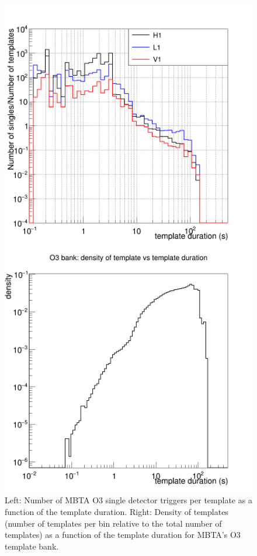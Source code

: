 \begin{figure}[hb]
  \centering
  \begin{minipage}{0.45\linewidth}
    \includegraphics[width=\textwidth]{sectionSelection/plotsOther/cDurationSingles.png}
  \end{minipage}
  \hfill
  \begin{minipage}{0.45\linewidth}
    \includegraphics[width=\textwidth]{sectionSelection/plotsOther/cTempDensity.png}
  \end{minipage}    
  \caption{Left: Number of MBTA O3 single detector triggers per template as a function of the template duration. Right: Density of templates (number of templates per bin relative to the total number of templates) as a function of the template duration for MBTA's O3 template bank.}
  \label{fig:singles_tempdur}
\end{figure}

